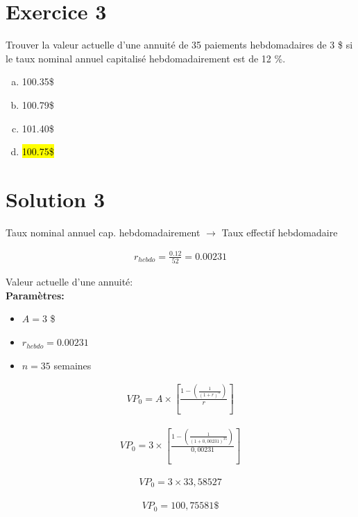 \documentclass[10pt,a4paper]{article}
\begin{document}
\newpage

\section*{Exercice 3}
Trouver la valeur actuelle d’une annuité de 35 paiements hebdomadaires de 3 \$ si le taux nominal annuel capitalisé hebdomadairement est de 12 \%.

\begin{enumerate}[a)]
\item 100.35\$
\item 100.79\$
\item 101.40\$
\item \hl{100.75\$}
\end{enumerate}

\section*{Solution 3}

Taux nominal annuel cap. hebdomadairement $\rightarrow$ Taux effectif hebdomadaire

\begin{align*}
r_{hebdo} = \frac{0.12}{52} = 0.00231
\end{align*}

Valeur actuelle d'une annuité:\\

\textbf{Paramètres:}
\begin{itemize} 
\item $A = 3$ \$ 
\item $r_{hebdo} = 0.00231$
\item $n = 35$ semaines
\end{itemize} 

\begin{align*}
VP_0=A \times \left[\frac{1-\left( \frac{1}{(1+r)^n}\right)}{r} \right] 
\end{align*}

\begin{align*}
VP_0=3 \times \left[\frac{1-\left( \frac{1}{(1+0,00231)^{35}}\right)}{0,00231} \right] 
\end{align*}

\begin{align*}
VP_0=3 \times 33,58527
\end{align*}


\begin{align*}
VP_0 = 100,75581 \$
\end{align*}
\end{document}
